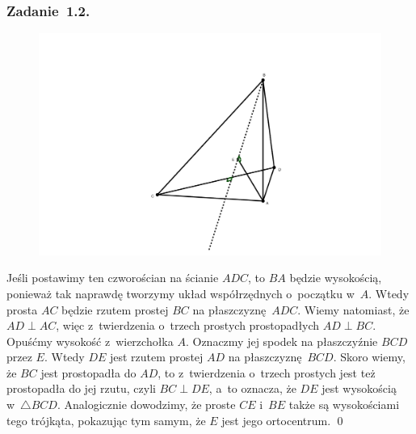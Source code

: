 \subsubsection*{Zadanie~1.2.}
\begin{figure}[H]
    \centering
    \includegraphics[width=\textwidth]{img/2021_01_27/2.png}
\end{figure}
Jeśli postawimy ten czworościan na ścianie \(ADC\), to \(BA\) będzie wysokością, ponieważ tak naprawdę tworzymy układ współrzędnych o~początku w~\(A\). Wtedy prosta \(AC\) będzie rzutem prostej \(BC\) na płaszczyznę \(ADC\). Wiemy natomiast, że \(AD \perp AC\), więc z~twierdzenia o~trzech prostych prostopadłych \(AD \perp BC\). Opuśćmy wysokość z~wierzchołka \(A\). Oznaczmy jej spodek na płaszczyźnie \(BCD\) przez \(E\). Wtedy \(DE\) jest rzutem prostej \(AD\) na płaszczyznę \(BCD\). Skoro wiemy, że \(BC\) jest prostopadła do \(AD\), to z~twierdzenia o~trzech prostych jest też prostopadła do jej rzutu, czyli \(BC \perp DE\), a~to oznacza, że \(DE\) jest wysokością w~\(\triangle{BCD}\). Analogicznie dowodzimy, że proste \(CE\) i~\(BE\) także są wysokościami tego trójkąta, pokazując tym samym, że \(E\) jest jego ortocentrum.
\qed

